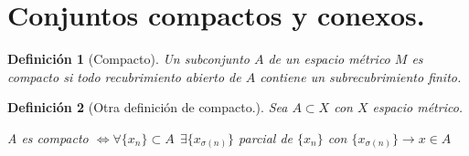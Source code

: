 \documentclass[11pt, a4paper]{article}
\theoremstyle{theorem-style}
\theoremstyle{definition-style}
\newtheorem*{ndef}{Definición}
\theoremstyle{remark-style}
\theoremstyle{example-style}
\begin{document}
\section{Conjuntos compactos y conexos.}

\begin{ndef}[Compacto]
	Un subconjunto $A$ de un espacio métrico $M$ es compacto si todo recubrimiento abierto de $A$ contiene un subrecubrimiento finito.
\end{ndef}

\begin{ndef}[Otra definición de compacto.]
Sea $A \subset X$ con $X$ espacio métrico.
\begin{center}
	A es compacto $\iff \forall \{x_n\} \subset A \ \ \exists \{x_{\sigma(n)}\}$ parcial de $\{x_n\}$ con $\{x_{\sigma(n)}\}\to x \in A$
\end{center}	
\end{ndef}
\end{document}
